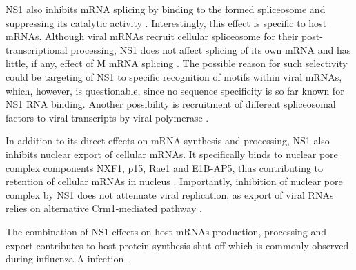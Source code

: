 		NS1 also inhibits mRNA splicing by binding to the formed spliceosome and suppressing its catalytic activity \parencite{Lu1994, Qiu1995}. Interestingly, this effect is specific to host mRNAs. Although viral mRNAs recruit cellular spliceosome for their post-transcriptional processing, NS1 does not affect splicing of its own mRNA \parencite{Robb2010} and has little, if any, effect of M mRNA splicing \parencite{Salvatore2002, Robb2012}. The possible reason for such selectivity could be targeting of NS1 to specific recognition of motifs within viral mRNAs, which, however, is questionable, since no sequence specificity is so far known for NS1 RNA binding. Another possibility is recruitment of different spliceosomal factors to viral transcripts by viral polymerase \parencite{Fournier2014}.
		
		In addition to its direct effects on mRNA synthesis and processing, NS1 also inhibits nuclear export of cellular mRNAs. It specifically binds to nuclear pore complex components NXF1, p15, Rae1 and E1B-AP5, thus contributing to retention of cellular mRNAs in nucleus \parencite{Satterly2007}. Importantly, inhibition of nuclear pore complex by NS1 does not attenuate viral replication, as export of viral RNAs relies on alternative Crm1-mediated pathway \parencite{Neumann2000}.
		
		The combination of NS1 effects on host mRNAs production, processing and export contributes to host protein synthesis shut-off which is commonly observed during influenza A infection \parencite{Beloso1992}.
		
	
		
			
		
		
				
	
		
		
